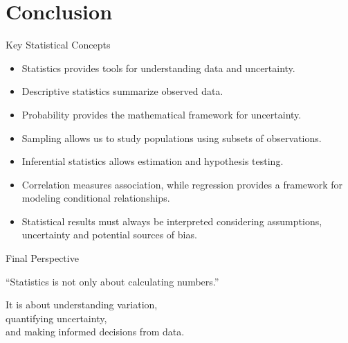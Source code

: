 \documentclass{beamer}
\begin{document}

\section{Conclusion}

\begin{frame}{Key Statistical Concepts}

\begin{itemize}

  \item Statistics provides tools for understanding data and uncertainty.

  \vskip 0.3cm

  \item Descriptive statistics summarize observed data.

  \vskip 0.3cm

  \item Probability provides the mathematical framework for uncertainty.

  \vskip 0.3cm

  \item Sampling allows us to study populations using subsets of observations.

  \vskip 0.3cm

  \item Inferential statistics allows estimation and hypothesis testing.

  \vskip 0.3cm

  \item Correlation measures association, while regression provides a framework for modeling conditional relationships.

  \vskip 0.3cm

  \item Statistical results must always be interpreted considering assumptions, uncertainty and potential sources of bias.

\end{itemize}

\end{frame}


\begin{frame}{Final Perspective}

\begin{center}

\Large
``Statistics is not only about calculating numbers.''

\vskip 0.8cm

\normalsize

It is about understanding variation,\\
quantifying uncertainty,\\
and making informed decisions from data.

\end{center}

\end{frame}
\end{document}
